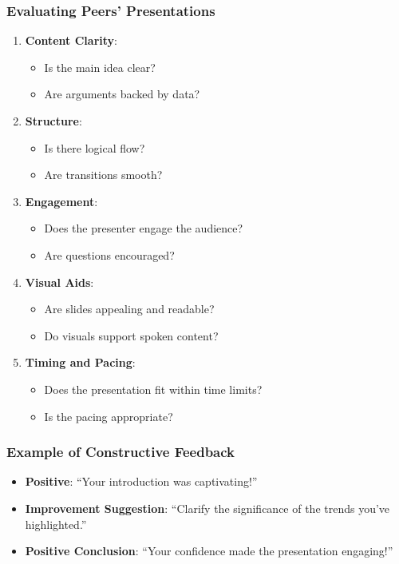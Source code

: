 \documentclass[aspectratio=169]{beamer}
\begin{document}
\begin{frame}[fragile]
    \frametitle{Evaluating Peers' Presentations}
    \begin{enumerate}
        \item \textbf{Content Clarity}:
            \begin{itemize}
                \item Is the main idea clear?
                \item Are arguments backed by data?
            \end{itemize}
        \item \textbf{Structure}:
            \begin{itemize}
                \item Is there logical flow?
                \item Are transitions smooth?
            \end{itemize}
        \item \textbf{Engagement}:
            \begin{itemize}
                \item Does the presenter engage the audience?
                \item Are questions encouraged?
            \end{itemize}
        \item \textbf{Visual Aids}:
            \begin{itemize}
                \item Are slides appealing and readable?
                \item Do visuals support spoken content?
            \end{itemize}
        \item \textbf{Timing and Pacing}:
            \begin{itemize}
                \item Does the presentation fit within time limits?
                \item Is the pacing appropriate?
            \end{itemize}
    \end{enumerate}
\end{frame}

\begin{frame}[fragile]
    \frametitle{Example of Constructive Feedback}
    \begin{itemize}
        \item \textbf{Positive}: “Your introduction was captivating!”
        \item \textbf{Improvement Suggestion}: “Clarify the significance of the trends you've highlighted.”
        \item \textbf{Positive Conclusion}: “Your confidence made the presentation engaging!”
    \end{itemize}
\end{frame}
\end{document}
